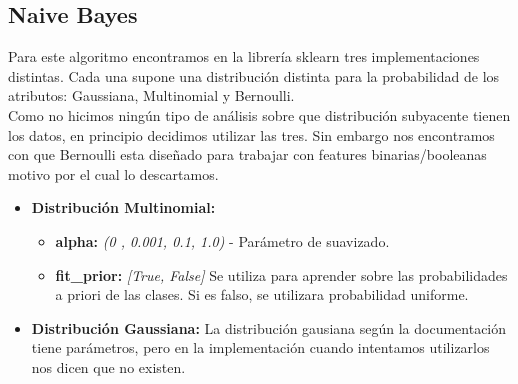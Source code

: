 \subsection{Naive Bayes}

Para este algoritmo encontramos en la librería sklearn tres implementaciones distintas. Cada una supone una distribución distinta para la probabilidad de los atributos: Gaussiana, Multinomial y Bernoulli.\\

Como no hicimos ningún tipo de análisis sobre que distribución subyacente tienen los datos, en principio decidimos utilizar las tres. Sin embargo nos encontramos con que Bernoulli esta diseñado para trabajar con features binarias/booleanas motivo por el cual lo descartamos.

\begin{itemize}
\item \textbf{Distribución Multinomial:}
        \begin{itemize}
        \item \textbf{alpha:} \textit{(0 , 0.001, 0.1, 1.0)} - Parámetro de suavizado. 
        \item \textbf{fit\_prior:} \textit{[True, False]} Se utiliza para aprender sobre las probabilidades a priori de las clases. Si es falso, se utilizara probabilidad uniforme.
        \end{itemize}
\item \textbf{Distribución Gaussiana:} La distribución gausiana según la documentación tiene parámetros, pero en la implementación cuando intentamos utilizarlos nos dicen que no existen.
\end{itemize}




